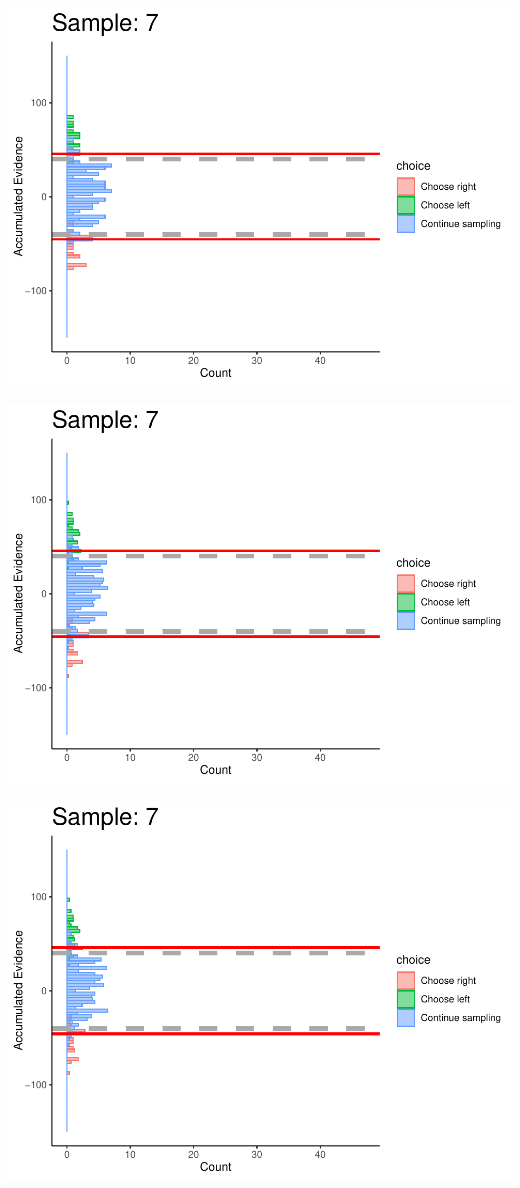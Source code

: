 \documentclass[
]{book}
\begin{document}
\begin{center}\includegraphics[width=0.8\linewidth]{LateNightBayes_files/figure-latex/collapsing_dcb-65} \end{center}

\begin{center}\includegraphics[width=0.8\linewidth]{LateNightBayes_files/figure-latex/collapsing_dcb-66} \end{center}

\begin{center}\includegraphics[width=0.8\linewidth]{LateNightBayes_files/figure-latex/collapsing_dcb-67} \end{center}
\end{document}
